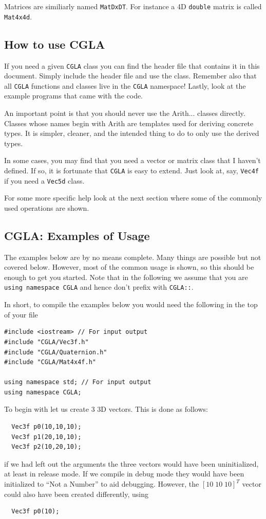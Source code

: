 \documentclass[a4paper]{article}
\begin{document}
Matrices are similiarly named \texttt{MatDxDT}. For instance a 4D
\texttt{double} matrix is called \texttt{Mat4x4d}.

\subsection{How to use CGLA}

If you need a given \texttt{CGLA} class you can find the header file that
contains it in this document. Simply include the header file and use
the class. Remember also that all \texttt{CGLA} functions and classes live in
the \texttt{CGLA} namespace! Lastly, look at the example programs that came
with the code.

An important point is that you should never use the Arith... classes
directly. Classes whose names begin with Arith are templates used for
deriving concrete types. It is simpler, cleaner, and the intended
thing to do to only use the derived types.

In some cases, you may find that you need a vector or matrix class
that I haven't defined. If so, it is fortunate that \texttt{CGLA} is easy to
extend. Just look at, say, \texttt{Vec4f} if you need a \texttt{Vec5d}
class.

For some more specific help look at the next section where some of the
commonly used operations are shown.


\subsection{CGLA: Examples of Usage}

The examples below are by no means complete. Many things are
possible but not covered below. However, most of the common usage is
shown, so this should be enough to get you started. Note that in the
following we assume that you are \texttt{using namespace CGLA} and
hence don't prefix with \texttt{CGLA::}.

In short, to compile the examples below you would need the following
in the top of your file

\begin{verbatim}
#include <iostream> // For input output
#include "CGLA/Vec3f.h"
#include "CGLA/Quaternion.h"
#include "CGLA/Mat4x4f.h"

using namespace std; // For input output
using namespace CGLA;
\end{verbatim}

To begin with let us create 3 3D vectors. This is done as follows:
\begin{verbatim}
  Vec3f p0(10,10,10);
  Vec3f p1(20,10,10);
  Vec3f p2(10,20,10);
\end{verbatim}
if we had left out the arguments the three vectors would have been
uninitialized, at least in release mode. If we compile in debug mode
they would have been initialized to ``Not a Number'' to aid
debugging. However, the $[10 \;10 \;10]^T$ vector could also have been
created differently, using
\begin{verbatim}
  Vec3f p0(10);
\end{verbatim}
\end{document}
